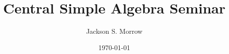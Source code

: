 \documentclass[12pt, reqno]{amsart}
\begin{document}
\title{Central Simple Algebra Seminar}
\author{Jackson S. Morrow}
\date{\today}
\maketitle 

\doublespacing
\tableofcontents
\singlespacing
\clearpage

\vspace{5em}
\vspace{5em}
\vspace{5em}
\vspace{5em}
\vspace{5em}
\vspace{5em}
\end{document}
